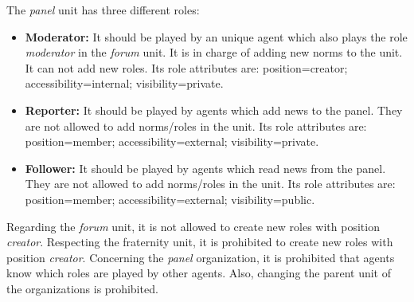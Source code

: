 The \textit{panel} unit has three different roles:
\begin{itemize}
\item \textbf{Moderator:} It should be played by an unique agent which also plays the role \textit{moderator} in the \textit{forum} unit. It is in charge of adding new norms to the unit. It can not add new roles. Its role attributes are: position=creator; accessibility=internal; visibility=private.
\item \textbf{Reporter:} It should be played by agents which add news to the panel. They are not allowed to add norms/roles in the unit. Its role attributes are: position=member; accessibility=external; visibility=private.
\item \textbf{Follower:} It should be played by agents which read news from the panel.  They are not allowed to add norms/roles in the unit. Its role attributes are: position=member; accessibility=external; visibility=public.
\end{itemize}

Regarding the \textit{forum} unit, it is not allowed to create new roles with position \textit{creator}.  Respecting the fraternity unit, it is prohibited to create new roles with position \textit{creator}. Concerning the \textit{panel} organization, it is prohibited that agents know which roles are played by other agents. Also, changing the parent unit of the organizations is prohibited.   

